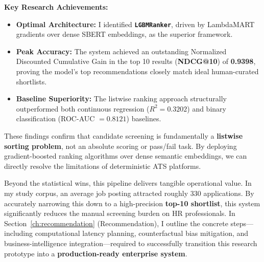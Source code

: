\textbf{Key Research Achievements:}
\begin{itemize}
    \item \textbf{Optimal Architecture:} I identified \textbf{\texttt{LGBMRanker}}, driven by LambdaMART gradients over dense SBERT embeddings, as the superior framework.
    \item \textbf{Peak Accuracy:} The system achieved an outstanding Normalized Discounted Cumulative Gain in the top 10 results (\textbf{NDCG@10}) of \textbf{0.9398}, proving the model's top recommendations closely match ideal human-curated shortlists.
    \item \textbf{Baseline Superiority:} The listwise ranking approach structurally outperformed both continuous regression ($R^2 = 0.3202$) and binary classification (ROC-AUC $= 0.8121$) baselines.
\end{itemize}

These findings confirm that candidate screening is fundamentally a \textbf{listwise sorting problem}, not an absolute scoring or pass/fail task. By deploying gradient-boosted ranking algorithms over dense semantic embeddings, we can directly resolve the limitations of deterministic ATS platforms. 

Beyond the statistical wins, this pipeline delivers tangible operational value. In my study corpus, an average job posting attracted roughly 330 applications. By accurately narrowing this down to a high-precision \textbf{top-10 shortlist}, this system significantly reduces the manual screening burden on HR professionals. In Section~\ref{ch:recommendation} (Recommendation), I outline the concrete steps---including computational latency planning, counterfactual bias mitigation, and business-intelligence integration---required to successfully transition this research prototype into a \textbf{production-ready enterprise system}.
